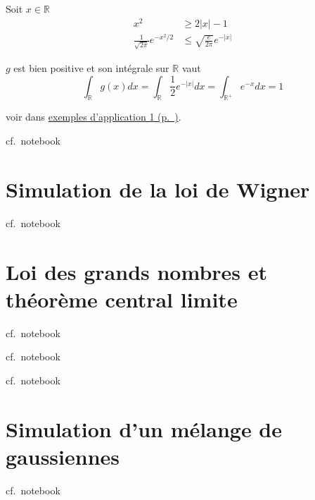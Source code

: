 \label{V-answer-lgrej1}
Soit \(x \in \mathbb{R}\) \begin{align*}
x^2 & \geq 2|x| - 1 \\
\frac{1}{\sqrt{2\pi}}e^{-x^2/2} & \leq \sqrt{\frac{e}{2\pi}} e^{-|x|}
\end{align*}

\label{V-answer-lgrej2}
\(g\) est bien positive et son intégrale sur \(\mathbb{R}\) vaut
\[\int_\mathbb{R}g(x) dx = \int_\mathbb{R}\frac{1}{2} e^{-|x|} dx = \int_{\mathbb{R}^+} e^{-x} dx = 1\]

\label{V-answer-lgrej3}
voir dans \protect\hyperref[V-exemples1]{exemples d'application
1 (p.~\pageref*{V-exemples1})}.

\label{V-answer-lgrej4}
cf.~notebook

\section{Simulation de la loi de Wigner}\label{V-answer-wigner}

cf.~notebook

\section{Loi des grands nombres et théorème central
limite}\label{V-loi-des-grands-nombres-et-thuxe9oruxe8me-central-limite-1}

\label{V-answer-lgntcl1}
cf.~notebook

\label{V-answer-lgntcl2}
cf.~notebook

\label{V-answer-lgntcl3}
cf.~notebook

\section{Simulation d'un mélange de
gaussiennes}\label{V-simulation-dun-muxe9lange-de-gaussiennes-1}

\label{V-answer-melloi1}
cf.~notebook

